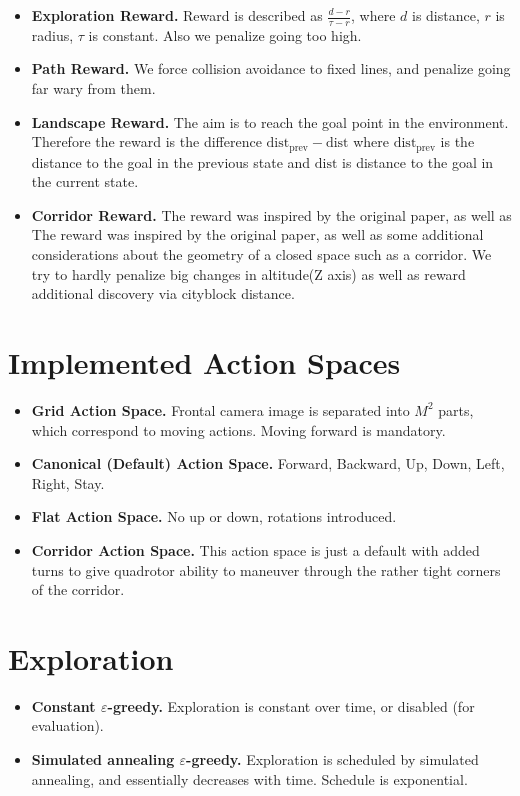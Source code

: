 \documentclass{article}
\begin{document}
\begin{itemize}
    \item {\bf Exploration Reward.} Reward is described as $\frac{d - r}{\tau - r}$, where $d$ is distance, $r$ is radius, $\tau$ is constant.
        Also we penalize going too high.
    \item {\bf Path Reward.} We force collision avoidance to fixed lines, and penalize going far wary from them.
    \item {\bf Landscape Reward.} The aim is to reach the goal point in the environment. Therefore the reward is the difference $\text{dist}_{\text{prev}} - \text{dist}$ where $\text{dist}_{\text{prev}}$ is the distance to the goal in the previous state and $\text{dist}$ is distance to the goal in the current state. 
    \item {\bf Corridor Reward.} The reward was inspired by the original paper, as well as  The reward was inspired by the original paper\cite{cad2rl}, as well as some additional considerations about the geometry of a closed space such as a corridor. We try to hardly penalize big changes in altitude(Z axis) as well as reward additional discovery via cityblock distance.  
\end{itemize}

\section{Implemented Action Spaces}

\begin{itemize}
    \item {\bf Grid Action Space.} Frontal camera image is separated into $M^2$ parts, which correspond to moving actions. Moving forward is mandatory.
    \item {\bf Canonical (Default) Action Space.} Forward, Backward, Up, Down, Left, Right, Stay.
    \item {\bf Flat Action Space.} No up or down, rotations introduced.
    \item {\bf Corridor Action Space.} This action space is just a default with added turns to give quadrotor ability to maneuver through the rather tight corners of the corridor. 
\end{itemize}

\section{Exploration}

\begin{itemize}
    \item {\bf Constant $\varepsilon$-greedy.} Exploration is constant over time, or disabled (for evaluation).
    \item {\bf Simulated annealing $\varepsilon$-greedy.} Exploration is scheduled by simulated annealing, and essentially decreases with time.
        Schedule is exponential.
\end{itemize}
\end{document}
